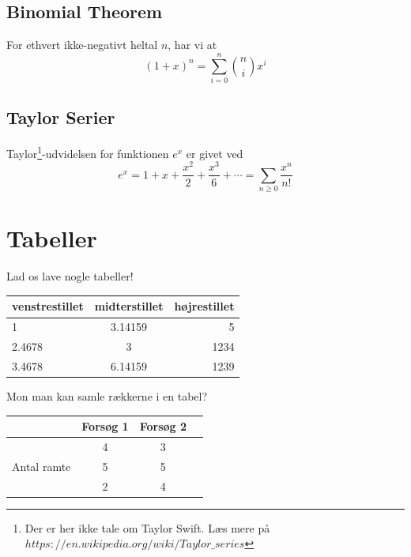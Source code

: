 \documentclass[]{article}
\begin{document}
\subsection{Binomial Theorem}
\begin{Theorem}
For ethvert ikke-negativt heltal $n$, har vi at
\[
	(1+x)^n = \sum_{i=0}^n {n \choose i} x^i
\]
\end{Theorem}

\subsection{Taylor Serier}
Taylor\footnote{Der er her ikke tale om Taylor Swift. Læs mere på
$https://en.wikipedia.org/wiki/Taylor\_series$}-udvidelsen for funktionen
$e^x$ er givet ved
\[
	e^x = 1 + x + \frac{x^2}{2} + \frac{x^3}{6} + \cdots = \sum_{n\geq 0} \frac{x^n}{n!}
\]

\section{Tabeller}
Lad os lave nogle tabeller!

\begin{center}
	\noindent
	\begin{tabular}{l||c|r}
		venstrestillet & midterstillet & højrestillet \\ \hline
		1 & 3.14159 & 5 \\
		2.4678 & 3 &  1234 \\ \hline \hline
		3.4678 & 6.14159 & 1239
	\end{tabular}
\end{center}


Mon man kan samle rækkerne i en tabel?

\begin{center}
	\noindent
	\begin{tabular}{|c|c|c|c| }
		\hline
		 & Forsøg 1 & Forsøg 2 \\
		\hline
		\multirow{3}{4em}{Antal ramte} & 4 & 3 \\
									   & 5 & 5 \\
									   & 2 & 4 \\
		\hline
	\end{tabular}
\end{center}
\newpage
\end{document}
